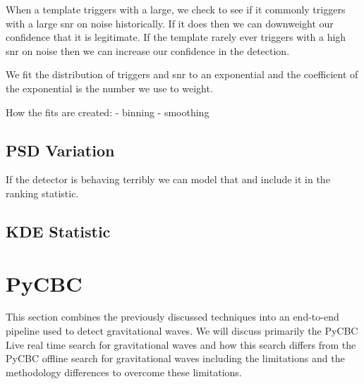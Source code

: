 When a template triggers with a large, we check to see if it commonly triggers with a large snr on noise historically. If it does then we can downweight our confidence that it is legitimate. If the template rarely ever triggers with a high snr on noise then we can increase our confidence in the detection.

We fit the distribution of triggers and snr to an exponential and the coefficient of the exponential is the number we use to weight.

How the fits are created:
- binning
- smoothing

\subsection{\label{2:sec:psd-variation}PSD Variation}

If the detector is behaving terribly we can model that and include it in the ranking statistic.

\subsection{\label{2:sec:kde-statistic} KDE Statistic}

\section{\label{2:sec:pycbc-live}PyCBC}





This section combines the previously discussed techniques into an end-to-end pipeline used to detect gravitational waves. We will discuss primarily the PyCBC Live real time search for gravitational waves and how this search differs from the PyCBC offline search for gravitational waves including the limitations and the methodology differences to overcome these limitations.

